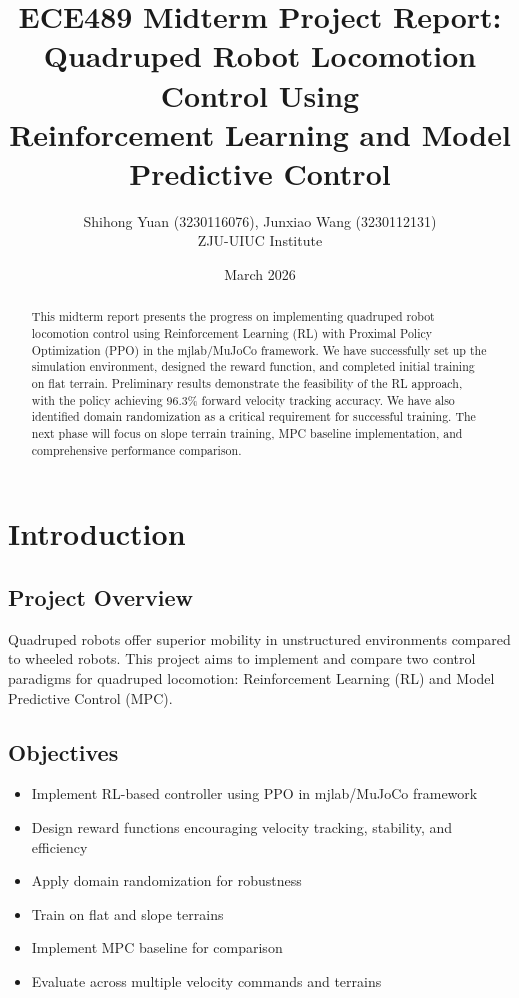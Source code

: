 \documentclass[12pt,a4paper]{article}
\title{\textbf{ECE489 Midterm Project Report:\\Quadruped Robot Locomotion Control Using\\Reinforcement Learning and Model Predictive Control}}
\author{Shihong Yuan (3230116076), Junxiao Wang (3230112131)\\ZJU-UIUC Institute}
\date{March 2026}
\begin{document}
\maketitle

\begin{abstract}
This midterm report presents the progress on implementing quadruped robot locomotion control using Reinforcement Learning (RL) with Proximal Policy Optimization (PPO) in the mjlab/MuJoCo framework. We have successfully set up the simulation environment, designed the reward function, and completed initial training on flat terrain. Preliminary results demonstrate the feasibility of the RL approach, with the policy achieving 96.3\% forward velocity tracking accuracy. We have also identified domain randomization as a critical requirement for successful training. The next phase will focus on slope terrain training, MPC baseline implementation, and comprehensive performance comparison.
\end{abstract}

\section{Introduction}

\subsection{Project Overview}

Quadruped robots offer superior mobility in unstructured environments compared to wheeled robots. This project aims to implement and compare two control paradigms for quadruped locomotion: Reinforcement Learning (RL) and Model Predictive Control (MPC).

\subsection{Objectives}

\begin{itemize}
    \item Implement RL-based controller using PPO in mjlab/MuJoCo framework
    \item Design reward functions encouraging velocity tracking, stability, and efficiency
    \item Apply domain randomization for robustness
    \item Train on flat and slope terrains
    \item Implement MPC baseline for comparison
    \item Evaluate across multiple velocity commands and terrains
\end{itemize}
\end{document}
